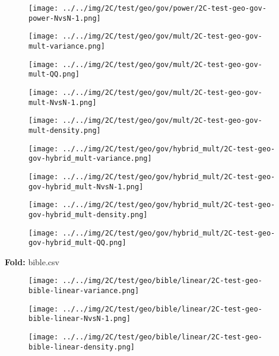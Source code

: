 \begin{figure}[H]
\centering	\texttt{[image: ../../img/2C/test/geo/gov/power/2C-test-geo-gov-power-NvsN-1.png]}
\end{figure}
\begin{figure}[H]
\centering	\texttt{[image: ../../img/2C/test/geo/gov/mult/2C-test-geo-gov-mult-variance.png]}
\end{figure}
\begin{figure}[H]
\centering	\texttt{[image: ../../img/2C/test/geo/gov/mult/2C-test-geo-gov-mult-QQ.png]}
\end{figure}
\begin{figure}[H]
\centering	\texttt{[image: ../../img/2C/test/geo/gov/mult/2C-test-geo-gov-mult-NvsN-1.png]}
\end{figure}
\begin{figure}[H]
\centering	\texttt{[image: ../../img/2C/test/geo/gov/mult/2C-test-geo-gov-mult-density.png]}
\end{figure}
\begin{figure}[H]
\centering	\texttt{[image: ../../img/2C/test/geo/gov/hybrid\_mult/2C-test-geo-gov-hybrid\_mult-variance.png]}
\end{figure}
\begin{figure}[H]
\centering	\texttt{[image: ../../img/2C/test/geo/gov/hybrid\_mult/2C-test-geo-gov-hybrid\_mult-NvsN-1.png]}
\end{figure}
\begin{figure}[H]
\centering	\texttt{[image: ../../img/2C/test/geo/gov/hybrid\_mult/2C-test-geo-gov-hybrid\_mult-density.png]}
\end{figure}
\begin{figure}[H]
\centering	\texttt{[image: ../../img/2C/test/geo/gov/hybrid\_mult/2C-test-geo-gov-hybrid\_mult-QQ.png]}
\end{figure}
\textbf{Fold:} bible.csv
\begin{figure}[H]
\centering	\texttt{[image: ../../img/2C/test/geo/bible/linear/2C-test-geo-bible-linear-variance.png]}
\end{figure}
\begin{figure}[H]
\centering	\texttt{[image: ../../img/2C/test/geo/bible/linear/2C-test-geo-bible-linear-NvsN-1.png]}
\end{figure}
\begin{figure}[H]
\centering	\texttt{[image: ../../img/2C/test/geo/bible/linear/2C-test-geo-bible-linear-density.png]}
\end{figure}
